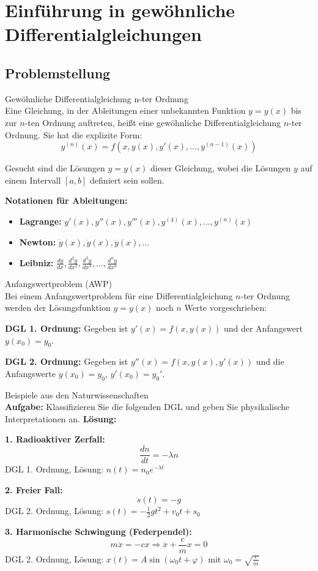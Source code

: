 \section{Einführung in gewöhnliche Differentialgleichungen}

\subsection{Problemstellung}

\begin{definition}{Gewöhnliche Differentialgleichung n-ter Ordnung}\\
Eine Gleichung, in der Ableitungen einer unbekannten Funktion $y = y(x)$ bis zur $n$-ten Ordnung auftreten, heißt eine gewöhnliche Differentialgleichung $n$-ter Ordnung. Sie hat die explizite Form:
$$y^{(n)}(x) = f\left(x, y(x), y'(x), ..., y^{(n-1)}(x)\right)$$

Gesucht sind die Lösungen $y = y(x)$ dieser Gleichung, wobei die Lösungen $y$ auf einem Intervall $[a,b]$ definiert sein sollen.

\textbf{Notationen für Ableitungen:}
\begin{itemize}
    \item \textbf{Lagrange:} $y'(x), y''(x), y'''(x), y^{(4)}(x), ..., y^{(n)}(x)$
    \item \textbf{Newton:} $\dot{y}(x), \ddot{y}(x), \dddot{y}(x), ...$
    \item \textbf{Leibniz:} $\frac{dy}{dx}, \frac{d^2y}{dx^2}, \frac{d^3y}{dx^3}, ..., \frac{d^ny}{dx^n}$
\end{itemize}
\end{definition}

\begin{definition}{Anfangswertproblem (AWP)}\\
Bei einem Anfangswertproblem für eine Differentialgleichung $n$-ter Ordnung werden der Lösungsfunktion $y = y(x)$ noch $n$ Werte vorgeschrieben:

\textbf{DGL 1. Ordnung:} Gegeben ist $y'(x) = f(x, y(x))$ und der Anfangswert $y(x_0) = y_0$.

\textbf{DGL 2. Ordnung:} Gegeben ist $y''(x) = f(x, y(x), y'(x))$ und die Anfangswerte $y(x_0) = y_0$, $y'(x_0) = y_0'$.
\end{definition}

\begin{example2}{Beispiele aus den Naturwissenschaften}\\
\textbf{Aufgabe:} Klassifizieren Sie die folgenden DGL und geben Sie physikalische Interpretationen an.
\tcblower
\textbf{Lösung:}

\textbf{1. Radioaktiver Zerfall:}
$$\frac{dn}{dt} = -\lambda n$$
DGL 1. Ordnung, Lösung: $n(t) = n_0 e^{-\lambda t}$

\textbf{2. Freier Fall:}
$$\ddot{s}(t) = -g$$
DGL 2. Ordnung, Lösung: $s(t) = -\frac{1}{2}gt^2 + v_0 t + s_0$

\textbf{3. Harmonische Schwingung (Federpendel):}
$$m\ddot{x} = -cx \Rightarrow \ddot{x} + \frac{c}{m}x = 0$$
DGL 2. Ordnung, Lösung: $x(t) = A \sin(\omega_0 t + \varphi)$ mit $\omega_0 = \sqrt{\frac{c}{m}}$
\end{example2}

